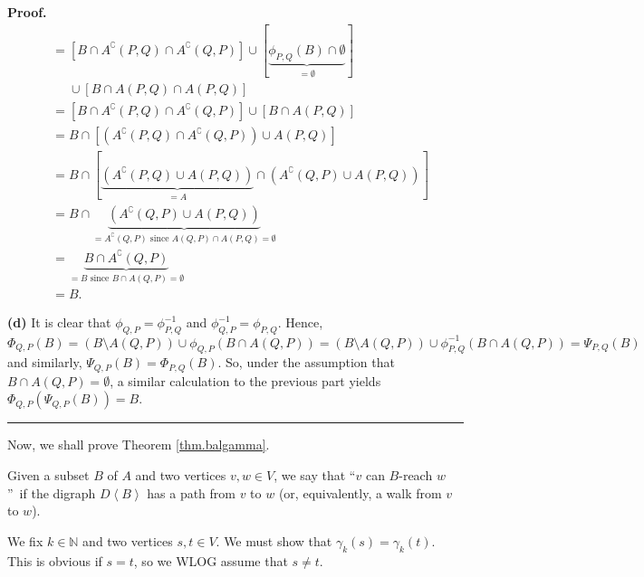 \documentclass[numbers=enddot,12pt,final,onecolumn,notitlepage]{scrartcl}%
\theoremstyle{definition}
\newenvironment{proof}[1][Proof]{\noindent\textbf{#1.} }{\ \rule{0.5em}{0.5em}}
\theoremstyle{plainsl}
\begin{document}
\begin{proof}
\begin{align*}
&  = [B \cap A^{\complement}(P,Q) \cap A^{\complement}(Q,P)] \cup
[\underbrace{\phi_{P,Q}(B) \cap\emptyset}_{=\emptyset}]\\
&  \ \ \ \ \ \ \cup[B \cap A(P,Q) \cap A(P,Q)]\\
&  = [B \cap A^{\complement}(P,Q) \cap A^{\complement}(Q,P)] \cup[B \cap
A(P,Q)]\\
&  = B \cap[(A^{\complement}(P,Q) \cap A^{\complement}(Q,P)) \cup A(P,Q)]\\
&  = B \cap[\underbrace{(A^{\complement}(P,Q) \cup A(P,Q))}_{=A}
\cap(A^{\complement}(Q,P) \cup A(P,Q))]\\
&  = B \cap\underbrace{(A^{\complement}(Q,P) \cup A(P,Q))}_{=A^{\complement
}(Q,P) \text{ since } A(Q,P) \cap A(P,Q) = \emptyset}\\
&  = \underbrace{B \cap A^{\complement}(Q,P)}_{=B \text{ since } B \cap A(Q,P)
= \emptyset}\\
&  = B.
\end{align*}


\medskip\textbf{(d)} It is clear that $\phi_{Q,P} = \phi_{P,Q}^{-1}$ and
$\phi_{Q,P}^{-1} = \phi_{P,Q}$. Hence, $\Phi_{Q,P}(B) = (B \setminus A(Q,P))
\cup\phi_{Q,P}(B \cap A(Q,P)) = (B \setminus A(Q,P)) \cup\phi_{P,Q}^{-1}(B
\cap A(Q,P)) = \Psi_{P,Q}(B)$ and similarly, $\Psi_{Q,P}(B) = \Phi_{P,Q}(B)$.
So, under the assumption that $B \cap A(Q,P) = \emptyset$, a similar
calculation to the previous part yields $\Phi_{Q,P}(\Psi_{Q,P}(B)) = B$.
\end{proof}

Now, we shall prove Theorem \ref{thm.balgamma}.

Given a subset $B$ of $A$ and two vertices $v,w\in V$, we say that
\textquotedblleft$v$ can $B$-reach $w$\textquotedblright\ if the digraph
$D\left\langle B\right\rangle $ has a path from $v$ to $w$ (or, equivalently,
a walk from $v$ to $w$).

We fix $k\in\mathbb{N}$ and two vertices $s,t\in V$. We must show that
$\gamma_{k}\left(  s\right)  =\gamma_{k}\left(  t\right)  $. This is obvious
if $s=t$, so we WLOG assume that $s\neq t$.
\end{document}
